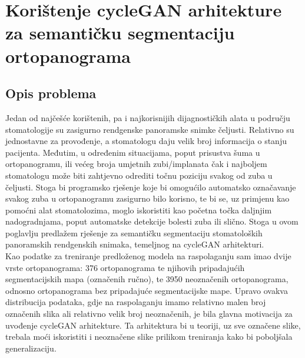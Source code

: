 \chapter{Korištenje cycleGAN arhitekture za semantičku segmentaciju ortopanograma}

\section{Opis problema}

Jedan od najčešće korištenih, pa i najkorisnijih dijagnostičkih alata u području stomatologije su zasigurno rendgenske panoramske snimke čeljusti. Relativno su jednostavne za provođenje, a stomatologu daju velik broj informacija o stanju pacijenta. Međutim, u određenim situacijama, poput prisustva šuma u ortopanogramu, ili većeg broja umjetnih zubi/implanata čak i najboljem stomatologu može biti zahtjevno odrediti točnu poziciju svakog od zuba u čeljusti. Stoga bi programsko rješenje koje bi omogućilo automatsko označavanje svakog zuba u ortopanogramu zasigurno bilo korisno, te bi se, uz primjenu kao pomoćni alat stomatolozima, moglo iskoristiti kao početna točka daljnjim nadogradnjama, poput automatske detekcije bolesti zuba ili slično. Stoga u ovom poglavlju predlažem rješenje za semantičku segmentaciju stomatoloških panoramskih rendgenskih snimaka, temeljnog na cycleGAN arhitekturi.\\

\noindent Kao podatke za treniranje predloženog modela na raspolaganju sam imao dvije vrste ortopanograma: 376 ortopanograma te njihovih pripadajućih segmentacijskih mapa (označenih ručno), te 3950 neoznačenih ortopanograma, odnosno ortopanograma bez pripadajuće segmentacijske mape. Upravo ovakva distribucija podataka, gdje na raspolaganju imamo relativno malen broj označenih slika ali relativno velik broj neoznačenih, je bila glavna motivacija za uvođenje cycleGAN arhitekture. Ta arhitektura bi u teoriji, uz sve označene slike, trebala moći iskoristiti i neoznačene slike prilikom treniranja kako bi poboljšala generalizaciju. 


